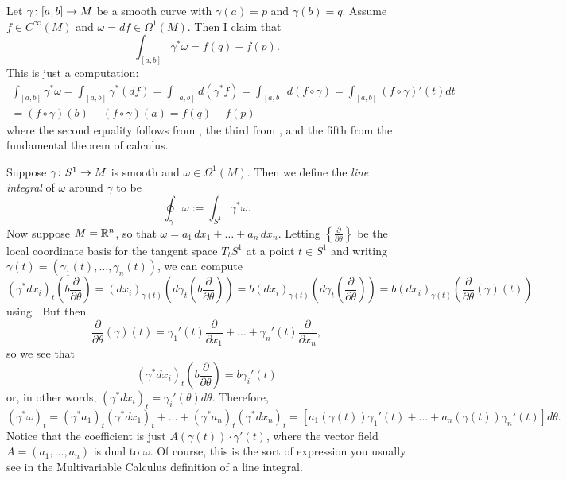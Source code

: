 \begin{example}\label{ex:integrating along a curve}
	Let $\gamma \colon\thinspace\! [a,b] \to M$ be a smooth curve with $\gamma(a) = p$ and $\gamma(b) = q$. Assume $f \in C^\infty(M)$ and $\omega = df \in \Omega^1(M)$. Then I claim that
	\[
		\int_{[a,b]} \gamma^\ast \omega = f(q) - f(p).
	\]
	This is just a computation:
	\begin{multline*}
		\int_{[a,b]} \gamma^\ast \omega = \int_{[a,b]}\gamma^\ast(df) = \int_{[a,b]} d (\gamma^\ast f) = \int_{[a,b]} d(f \circ \gamma) = \int_{[a,b]}(f \circ \gamma)'(t)dt \\
		= (f \circ \gamma)(b) - (f\circ \gamma)(a) = f(q)-f(p)
	\end{multline*}
	where the second equality follows from , the third from , and the fifth from the fundamental theorem of calculus.
\end{example}

\begin{example}\label{ex:line integral}
	Suppose $\gamma \colon\thinspace\! S^1 \to M$ is smooth and $\omega \in \Omega^1(M)$. Then we define the \emph{line integral} of $\omega$ around $\gamma$ to be
	\[
		\oint_\gamma \omega := \int_{S^1} \gamma^\ast \omega.
	\]
	Now suppose $M = \mathbb{R}^n$, so that $\omega = a_1 \, dx_1 + \dots + a_n \, dx_n$. Letting $\left\{\frac{\partial}{\partial \theta}\right\}$ be the local coordinate basis for the tangent space $T_t S^1$ at a point $t \in S^1$ and writing $\gamma(t) = (\gamma_1(t), \dots , \gamma_n(t))$, we can compute
	\[
		(\gamma^\ast dx_i)_t \left(b \frac{\partial}{\partial \theta} \right) = (dx_i)_{\gamma(t)} \left(d\gamma_t\left(b \frac{\partial}{\partial \theta}\right)\right) = b (dx_i)_{\gamma(t)} \left(d\gamma_t\left(\frac{\partial}{\partial \theta}\right)\right) = b (dx_i)_{\gamma(t)} \left(\frac{\partial}{\partial \theta}(\gamma)(t)\right) 
	\]
	using . But then
	\[
		\frac{\partial}{\partial \theta}(\gamma)(t) = \gamma_1'(t) \frac{\partial}{\partial x_1} + \dots + \gamma_n'(t) \frac{\partial}{\partial x_n},
	\]
	so we see that 
	\[
		(\gamma^\ast dx_i)_t \left(b \frac{\partial}{\partial \theta} \right) = b \gamma_i'(t)
	\]
	or, in other words, $(\gamma^\ast dx_i)_t = \gamma_i'(\theta)d\theta$. Therefore,
	\[
		(\gamma^\ast \omega)_t = (\gamma^\ast a_1)_t (\gamma^\ast dx_1)_t + \dots + (\gamma^\ast a_n)_t (\gamma^\ast dx_n)_t = \left[a_1(\gamma(t)) \gamma_1'(t) + \dots + a_n(\gamma(t))\gamma_n'(t)\right] d\theta.
	\]
	Notice that the coefficient is just $A(\gamma(t))\cdot \gamma'(t)$, where the vector field $A = (a_1, \dots , a_n)$ is dual to $\omega$. Of course, this is the sort of expression you usually see in the Multivariable Calculus definition of a line integral.
\end{example}

